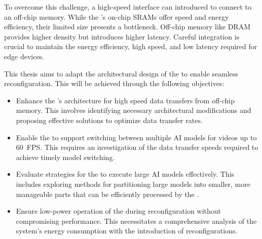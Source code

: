 To overcome this challenge, a high-speed interface can introduced to connect to an off-chip memory.
While the \graicore{}'s on-chip SRAMs offer speed and energy efficiency, their limited size presents a bottleneck.
Off-chip memory like DRAM provides higher density but introduces higher latency.
Careful integration is crucial to maintain the energy efficiency, high speed, and low latency required for edge devices.

This thesis aims to adapt the architectural design of the \graicore{} to enable seamless reconfiguration.
This will be achieved through the following objectives:
\begin{itemize}
    \item
    Enhance the \graicore{}'s architecture for high speed data transfers from off-chip memory.
    This involves identifying necessary architectural modifications and proposing effective solutions to optimize data transfer rates.
    \item
    Enable the \graicore{} to support switching between multiple AI models for videos up to \SI{60}{FPS}.
    This requires an investigation of the data transfer speeds required to achieve timely model switching.
    \item
    Evaluate strategies for the \graicore{} to execute large AI models effectively.
    This includes exploring methods for partitioning large models into smaller, more manageable parts that can be efficiently processed by the \graicore{}.
    \item
    Ensure low-power operation of the \graicore{} during reconfiguration without compromising performance.
    This necessitates a comprehensive analysis of the system's energy consumption with the introduction of reconfigurations.
\end{itemize}
